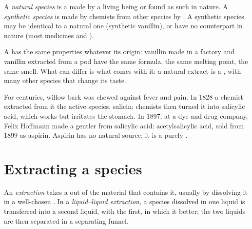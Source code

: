 \begin{definition}\label{def:g10:chemical-species:natural}
A \emph{natural species} is a 
made by a living being or found as such in nature. A \emph{synthetic
species} is made by chemists from other species
by . A synthetic species may be identical to a natural
one (synthetic vanillin), or have no counterpart in nature (most
medicines and ).
\end{definition}

\begin{proposition}\label{prop:g10:chemical-species:same}
A  has the same properties whatever its origin:
vanillin made in a factory and vanillin extracted from a pod have the same
formula, the same melting point, the same smell. What can differ is what
comes with it: a natural extract is a , with many other species
that change its taste.
\end{proposition}

\begin{history}
For centuries, willow bark was chewed against fever and pain. In 1828 a
chemist extracted from it the active species, salicin; chemists then
turned it into salicylic acid, which works but irritates the stomach. In
1897, at a dye and drug company, Felix Hoffmann made a gentler  from salicylic acid: acetylsalicylic acid, sold from 1899 as
aspirin. Aspirin has no natural source: it is a purely .
\end{history}

\section{Extracting a species}

\begin{definition}\label{def:g10:chemical-species:extraction}
An \emph{extraction} takes a  out of
the material that contains it, usually by dissolving it in a well-chosen
. In a \emph{liquid--liquid extraction}, a species dissolved in one liquid is transferred into a
second liquid,  with the first, in which it  better;
the two liquids are then separated in a separating funnel.
\end{definition}

